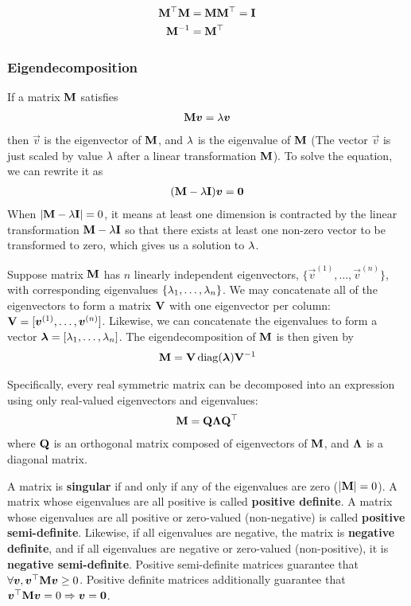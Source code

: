 \begin{align*}
	\mathbf{M}{}^\top\mathbf{M}&=\mathbf{M}\mathbf{M}{}^\top=\mathbf{I} \\
	\mathbf{M}^{-1}&=\mathbf{M}{}^\top
\end{align*}

\subsubsection*{Eigendecomposition}

If a matrix $\mathbf{M}$ satisfies
\begin{align*}
	\mathbf{M}\boldsymbol{v}=\lambda\boldsymbol{v}
\end{align*}
then $\vec{v}$ is the eigenvector of $\mathbf{M}$, and $\lambda$ is the eigenvalue of $\mathbf{M}$ (The vector $\vec{v}$ is just scaled by value $\lambda$ after a linear transformation $\mathbf{M}$). To solve the equation, we can rewrite it as
\begin{align*}
	(\mathbf{M}-\lambda\mathbf{I})\boldsymbol{v}=\boldsymbol{0}
\end{align*}
When $\left\vert \mathbf{M}-\lambda\mathbf{I} \right\vert=0$, it means at least one dimension is contracted by the linear transformation $\mathbf{M}-\lambda\mathbf{I}$ so that there exists at least one non-zero vector to be transformed to zero, which gives us a solution to $\lambda$.

Suppose matrix $\mathbf{M}$ has $n$ linearly independent eigenvectors, $\{\vec{v}^{(1)},\dotsc,\vec{v}^{(n)}\}$, with corresponding eigenvalues $\{\lambda_1,\dotsc,\lambda_n\}$. We may concatenate all of the eigenvectors to form a matrix $\mathbf{V}$ with one eigenvector per column: $\mathbf{V}=[\boldsymbol{v}^{(1)},\dotsc,\boldsymbol{v}^{(n)}]$. Likewise, we can concatenate the eigenvalues to form a vector $\boldsymbol{\lambda}=[\lambda_1,\dotsc,\lambda_n]$. The eigendecomposition of $\mathbf{M}$ is then given by
\begin{align*}
	\mat{M}=\mat{V}\diag(\vec{\la})\mat{V}\inv
\end{align*}

Specifically, every real symmetric matrix can be decomposed into an expression using only real-valued eigenvectors and eigenvalues:
\begin{align*}
	\mathbf{M}=\mathbf{Q}\mathbf{\Lambda}\mathbf{Q}{}^\top
\end{align*}
where $\mathbf{Q}$ is an orthogonal matrix composed of eigenvectors of $\mathbf{M}$, and $\mathbf{\Lambda}$ is a diagonal matrix.

A matrix is {\bf singular} if and only if any of the eigenvalues are zero ($\left\vert \mathbf{M} \right\vert=0$). A matrix whose eigenvalues are all positive is called {\bf positive definite}. A matrix whose eigenvalues are all positive or zero-valued (non-negative) is called {\bf positive semi-definite}. Likewise, if all eigenvalues are negative, the matrix is {\bf negative definite}, and if all eigenvalues are negative or zero-valued (non-positive), it is {\bf negative semi-definite}. Positive semi-definite matrices guarantee that $\forall\boldsymbol{v}, \boldsymbol{v}{}^\top\mathbf{M}\boldsymbol{v}\geq0$. Positive definite matrices additionally guarantee that $\boldsymbol{v}{}^\top\mathbf{M}\boldsymbol{v}=0\Rightarrow\boldsymbol{v}=\boldsymbol{0}$.

